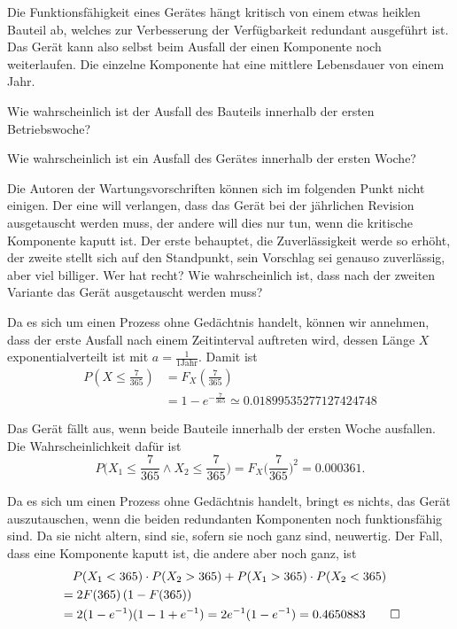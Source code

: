 Die Funktionsfähigkeit eines Gerätes hängt kritisch von einem etwas
heiklen Bauteil ab, welches zur Verbesserung der Verfügbarkeit redundant
ausgeführt ist. Das Gerät kann also selbst beim Ausfall der einen
Komponente noch weiterlaufen. Die einzelne Komponente hat eine mittlere
Lebensdauer von einem Jahr.
\begin{teilaufgaben}
\item Wie wahrscheinlich ist der Ausfall des Bauteils innerhalb der
ersten Betriebswoche?
\item Wie wahrscheinlich ist ein Ausfall des Gerätes innerhalb der
ersten Woche?
\item Die Autoren der Wartungsvorschriften können sich im folgenden Punkt
nicht einigen. Der eine will verlangen, dass das Gerät bei der jährlichen
Revision ausgetauscht werden muss, der andere will dies nur tun, wenn
die kritische Komponente kaputt ist.
Der erste behauptet, die Zuverlässigkeit werde so erhöht, der zweite
stellt sich auf den Standpunkt, sein Vorschlag sei genauso zuverlässig,
aber viel billiger. Wer hat recht? Wie wahrscheinlich ist, dass nach der
zweiten Variante das Gerät ausgetauscht werden muss?
\end{teilaufgaben}


\begin{loesung}
\begin{teilaufgaben}
\item Da es sich um einen Prozess ohne Gedächtnis handelt, können wir
annehmen, dass der erste Ausfall nach einem Zeitinterval auftreten
wird, dessen Länge $X$ exponentialverteilt ist mit $a=\frac1{1\text{Jahr}}$.
Damit ist
\begin{align*}
P\left(X\le \frac{7}{365}\right)
&=
F_X\left(\frac{7}{365}\right)\\
&=
1-e^{-\frac{7}{365}}
\simeq
0.01899535277127424748
\end{align*}
\item
Das Gerät fällt aus, wenn beide Bauteile innerhalb der ersten
Woche ausfallen. Die Wahrscheinlichkeit dafür ist
\[
P\biggl(X_1\le \frac{7}{365}\wedge X_2\le \frac{7}{365}\biggr)
=F_X\biggl(\frac{7}{365}\biggr)^2=0.000361.
\]
\item
Da es sich um einen Prozess ohne Gedächtnis handelt, bringt es
nichts, das Gerät auszutauschen, wenn die beiden redundanten Komponenten
noch funktionsfähig sind. Da sie nicht altern, sind sie, sofern sie
noch ganz sind, neuwertig.
Der Fall, dass eine Komponente kaputt ist, die andere aber noch ganz,
ist
\begin{align*}
&\quad P(X_1 < 365)\cdot P(X_2>365)
+P(X_1 > 365)\cdot P(X_2<365)
\\
&=
2F(365)\,(1-F(365))
\\
&=
2(1-e^{-1})(1-1+e^{-1})=2e^{-1}(1-e^{-1})=0.4650883
\qedhere
\end{align*}
\end{teilaufgaben}
\end{loesung}


